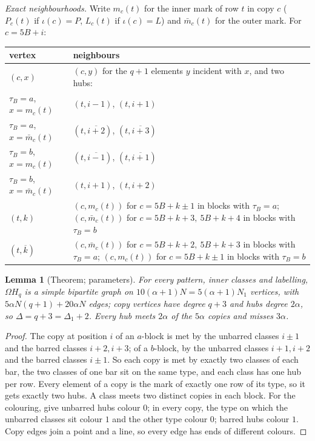 \documentclass[11pt]{amsart}
\theoremstyle{plain}
\newtheorem{lemma}{Lemma}[section]
\theoremstyle{definition}
\theoremstyle{remark}
\newcommand{\bk}[1]{\overline{#1}}
\newcommand{\Om}{\Omega}
\newcommand{\pP}{P}  %
\newcommand{\lL}{L}  %
\begin{document}
\emph{Exact neighbourhoods.} Write $m_c(t)$ for the inner mark of row $t$ in copy $c$ ($P_c(t)$ if $\iota(c) = \pP$,
$L_c(t)$ if $\iota(c) = \lL$) and $\bar m_c(t)$ for the outer mark. For $c = 5B + i$:
\begin{center}\small
\begin{tabular}{@{}lp{11.2cm}@{}}
\toprule
vertex & neighbours\\
\midrule
$(c,x)$ & $(c,y)$ for the $q+1$ elements $y$ incident with $x$, and two hubs:\\
\quad $\tau_B = a$, $x = m_c(t)$ & $(t, i-1)$, $(t, i+1)$\\
\quad $\tau_B = a$, $x = \bar m_c(t)$ & $(t, \bk{i+2})$, $(t, \bk{i+3})$\\
\quad $\tau_B = b$, $x = m_c(t)$ & $(t, \bk{i-1})$, $(t, \bk{i+1})$\\
\quad $\tau_B = b$, $x = \bar m_c(t)$ & $(t, i+1)$, $(t, i+2)$\\
$(t,k)$ & $(c, m_c(t))$ for $c = 5B + k \pm 1$ in blocks with $\tau_B = a$;\newline
  $(c, \bar m_c(t))$ for $c = 5B+k+3,\ 5B+k+4$ in blocks with $\tau_B = b$\\
$(t,\bk k)$ & $(c, \bar m_c(t))$ for $c = 5B + k+2,\ 5B+k+3$ in blocks with $\tau_B = a$;\newline
  $(c, m_c(t))$ for $c = 5B+k\pm1$ in blocks with $\tau_B = b$\\
\bottomrule
\end{tabular}
\end{center}

\begin{lemma}[Theorem; parameters]\label{lem:params}
For every pattern, inner classes and labelling, $\Om H_q$ is a simple bipartite graph on $10(\alpha+1)N = 5(\alpha+1)N_1$
vertices, with $5\alpha N(q+1) + 20\alpha N$ edges; copy vertices have degree $q+3$ and hubs degree $2\alpha$, so
$\Delta = q + 3 = \Delta_1 + 2$. Every hub meets $2\alpha$ of the $5\alpha$ copies and misses $3\alpha$.
\end{lemma}

\begin{proof}
The copy at position $i$ of an $a$-block is met by the unbarred classes $i \pm 1$ and the barred classes $i+2, i+3$; of a
$b$-block, by the unbarred classes $i+1, i+2$ and the barred classes $i \pm 1$. So each copy is met by exactly two
classes of each bar, the two classes of one bar sit on the same type, and each class has one hub per row. Every element
of a copy is the mark of exactly one row of its type, so it gets exactly two hubs. A class meets two distinct copies in
each block. For the colouring, give unbarred hubs colour $0$; in every copy, the type on which the unbarred classes sit
colour $1$ and the other type colour $0$; barred hubs colour $1$. Copy edges join a point and a line, so every edge has
ends of different colours.
\end{proof}
\end{document}
